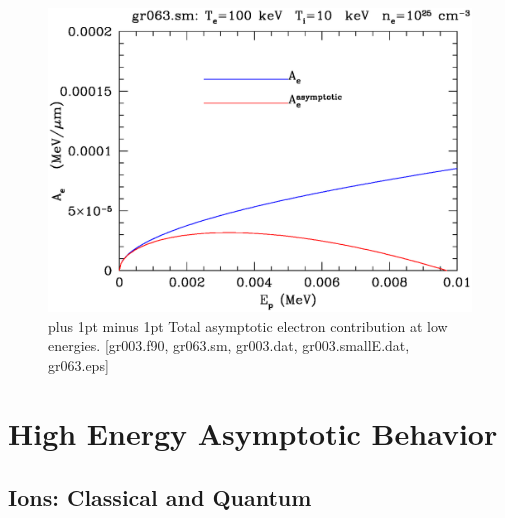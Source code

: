 \documentclass[preprint,12pt,eqsecnum,nofootinbib,amsmath,amssymb]{revtex4}
\newcommand{\footnoteskip}{\baselineskip 12pt plus 1pt minus 1pt}
\begin{document}
\vskip-2cm 
\begin{figure}[h!]
\includegraphics[scale=0.45]{gr063.eps} 
\vskip-0.8cm 
\caption{\footnoteskip  
  Total asymptotic electron contribution at low energies. 
 [gr003.f90, gr063.sm, gr003.dat, gr003.smallE.dat, gr063.eps]
}
\label{fig:gr063}
\end{figure}



\pagebreak
\section{High Energy Asymptotic Behavior}

\subsection{Ions: Classical and Quantum}
\end{document}
